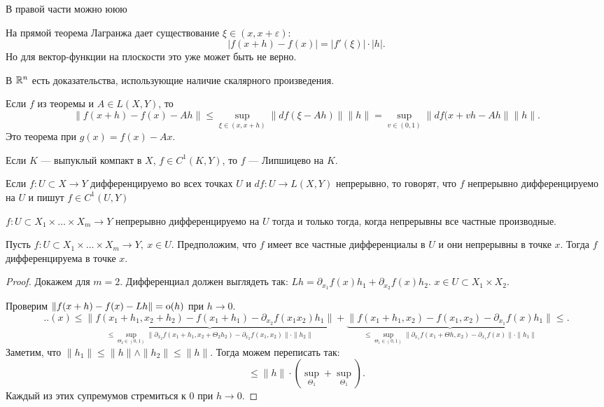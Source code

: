 \begin{note}
    В правой части можно ююю
\end{note}
\begin{note}
    На прямой теорема Лагранжа дает существование $ \xi \in (x, x+ \varepsilon )$: 
    \[
	\lvert f(x+h) - f(x) \rvert = |f'(\xi)| \cdot |h|
    .\] 
    Но для вектор-функции на плоскости это уже может быть не верно.
\end{note}
\begin{note}
    В $ \mathbb{R}^{n}  $ есть доказательства, использующие наличие скалярного произведения.
\end{note}
\begin{cor}
    Если $ f$ из теоремы и  $ A \in L(X, Y)$, то
    \[
	\| f(x + h) - f(x) - Ah\|  \le  \sup_{ \xi \in (x, x+h)} \| df( \xi -Ah) \| \| h \| = \sup_{v \in (0, 1)} \|  df(x+ v h - Ah \| \| h \|  
    .\] 
    Это теорема при $ g(x ) = f(x) - Ax$.
\end{cor}
\begin{cor}
    Если $ K$ --- выпуклый компакт в  $ X$,  $ f \in C^1(K, Y)$, то $ f$ --- Липшицево на $ K$.
\end{cor}
\begin{defn}
    Если $ f \colon U \subset X \to  Y$ дифференцируемо во всех точках $ U$ и  $ df \colon U \to  L(X, Y)$ непрерывно, то говорят, что $ f$  {\sf непрерывно дифференцируемо} на $ U$ и пишут  $ f \in C^{1}(U, Y)$  
\end{defn}
\begin{note}
    $ f \colon U \subset X_1 \times \ldots \times X_m \to  Y$ непрерывно дифференцируемо на $ U$ тогда и только тогда, когда непрерывны все частные производные.
\end{note}
\begin{thm}
    Пусть $ f \colon U \subset X_1 \times \ldots \times X_m \to  Y, ~ x \in U$. Предположим, что $ f$ имеет все частные дифференциалы в  $ U$ и они непрерывны в точке  $ x$. Тогда  $ f$ дифференцируема в точке  $ x$.
\end{thm}
\begin{proof}
    Докажем для $ m =2$. Дифференциал должен выглядеть так:  $ Lh = \partial _{x_1}f(x)h_1 + \partial _{x_2}f(x)h_2$. $ x \in  U \subset X_1 \times X_2$.

    Проверим $ \| f(x+h) - f(x) - Lh \| = {\mathop{\text{\rm o}}}(h)$ при $ h \to  0$.
    \[
	..(x) \le  \underbrace{\| f(x_1 + h_1, x_2+ h_2) - f(x_1 + h_1) - \partial _{x_2}f(x_1x_2)h_1 \|}_{ \le \sup_{\Theta_2 \in (0, 1)} \| \partial _{x_2} f(x_1+h_1, x_2+ \Theta_2 h_2) - \partial _{x_2}f(x_1, x_2) \| \cdot \| h_2 \| } + \underbrace{\| f(x_1 + h_1, x_2) - f(x_1, x_2) - \partial _{x_1}f(x)h_1 \|}_{ \le \sup_{\Theta_1 \in  (0, 1)} \| \partial _{x_1}f(x_1 + \Theta h, x_2) - \partial _{x_1}f(x) \| \cdot \| h_1 \| }  \le 
    .\] 
    Заметим, что $ \| h_1 \|  \le  \| h \| \wedge \| h_2 \| \le \| h \|  $.
    Тогда можем переписать  так: 
    \[
	\le \| h \|  \cdot \left( \sup_{\Theta_1} + \sup_{\Theta_1} \right) 
    .\] 
    Каждый из этих супремумов стремиться к 0 при $ h \to  0$.
\end{proof}
